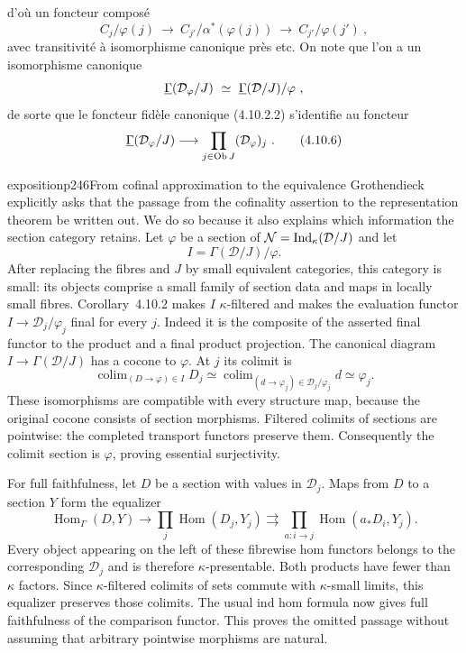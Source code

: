 
d'où un foncteur composé
\[
C_j/\varphi(j) \ \longrightarrow \ C_{j'}/\alpha^*(\varphi(j)) \ \longrightarrow \ C_{j'}/\varphi(j') \ ,
\]
avec transitivité à isomorphisme canonique près etc. On note que l'on a un isomorphisme canonique
\[
\uGamma(\mathcal{D}_\varphi/J) \ \simeq \ \uGamma(\mathcal{D}/J)/\varphi \ ,
\]
de sorte que le foncteur fidèle canonique (4.10.2.2) s'identifie au foncteur
\[
\uGamma(\mathcal{D}_\varphi/J) \longrightarrow \prod_{j\in\Ob J} (\mathcal{D}_\varphi)_j \ . \tag*{(4.10.6)}
\]

\begin{dcomment}{exposition}{p246}{From cofinal approximation to the equivalence}
Grothendieck explicitly asks that the passage from the cofinality assertion to the representation theorem be written out. We do so because it also explains which information the section category retains. Let $\varphi$ be a section of $\mathcal N=\mathrm{Ind}_\kappa(\mathcal D/J)$ and let
\[
 I=\Gamma(\mathcal D/J)/\varphi.
\]
After replacing the fibres and $J$ by small equivalent categories, this category is small: its objects comprise a small family of section data and maps in locally small fibres. Corollary~4.10.2 makes $I$ $\kappa$-filtered and makes the evaluation functor $I\to\mathcal D_j/\varphi_j$ final for every $j$. Indeed it is the composite of the asserted final functor to the product and a final product projection. The canonical diagram $I\to\Gamma(\mathcal D/J)$ has a cocone to $\varphi$. At $j$ its colimit is
\[
 \mathop{\mathrm{colim}}_{(D\to\varphi)\in I}D_j
 \simeq\mathop{\mathrm{colim}}_{(d\to\varphi_j)\in\mathcal D_j/\varphi_j}d
 \simeq\varphi_j.
\]
These isomorphisms are compatible with every structure map, because the original cocone consists of section morphisms. Filtered colimits of sections are pointwise: the completed transport functors preserve them. Consequently the colimit section is $\varphi$, proving essential surjectivity.

For full faithfulness, let $D$ be a section with values in $\mathcal D_j$. Maps from $D$ to a section $Y$ form the equalizer
\[
 \operatorname{Hom}_{\Gamma}(D,Y)\longrightarrow
 \prod_j\operatorname{Hom}(D_j,Y_j)
 \rightrightarrows
 \prod_{a:i\to j}\operatorname{Hom}(a_*D_i,Y_j).
\]
Every object appearing on the left of these fibrewise hom functors belongs to the corresponding $\mathcal D_j$ and is therefore $\kappa$-presentable. Both products have fewer than $\kappa$ factors. Since $\kappa$-filtered colimits of sets commute with $\kappa$-small limits, this equalizer preserves those colimits. The usual ind hom formula now gives full faithfulness of the comparison functor. This proves the omitted passage without assuming that arbitrary pointwise morphisms are natural.


\end{dcomment}
